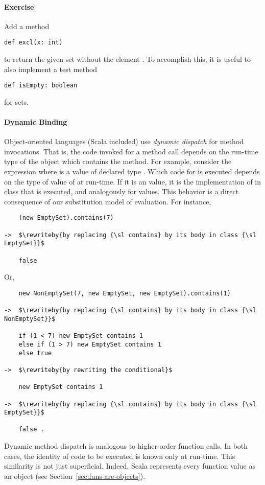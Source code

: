 \documentclass[a4paper,12pt,twoside,titlepage]{book}
\newcommand{\exercise}{\paragraph{Exercise}}
\newcommand{\rewriteby}[1]{\mbox{\tab\tab\rm(#1)}}
\begin{document}
\exercise Add a method 
\begin{lstlisting}
def excl(x: int)
\end{lstlisting}
to return the given set without the element . To accomplish this,
it is useful to also implement a test method
\begin{lstlisting}
def isEmpty: boolean
\end{lstlisting}
for sets.

\paragraph{Dynamic Binding}

Object-oriented languages (Scala included) use \emph{dynamic dispatch}
for method invocations.  That is, the code invoked for a method call
depends on the run-time type of the object which contains the method.
For example, consider the expression  where
 is a value of declared type . Which code for
 is executed depends on the type of value of  at run-time.
If it is an  value, it is the implementation of  in class  that is executed, and analogously for  values. 
This behavior is a direct consequence of our substitution model of evaluation.
For instance,
\begin{lstlisting}
    (new EmptySet).contains(7) 

->  $\rewriteby{by replacing {\sl contains} by its body in class {\sl EmptySet}}$

    false
\end{lstlisting}
Or,
\begin{lstlisting}
    new NonEmptySet(7, new EmptySet, new EmptySet).contains(1)

->  $\rewriteby{by replacing {\sl contains} by its body in class {\sl NonEmptySet}}$

    if (1 < 7) new EmptySet contains 1
    else if (1 > 7) new EmptySet contains 1
    else true

->  $\rewriteby{by rewriting the conditional}$

    new EmptySet contains 1

->  $\rewriteby{by replacing {\sl contains} by its body in class {\sl EmptySet}}$

    false .
\end{lstlisting}

Dynamic method dispatch is analogous to higher-order function
calls. In both cases, the identity of code to be executed is known
only at run-time. This similarity is not just superficial. Indeed,
Scala represents every function value as an object (see
Section~\ref{sec:funs-are-objects}).
\end{document}

